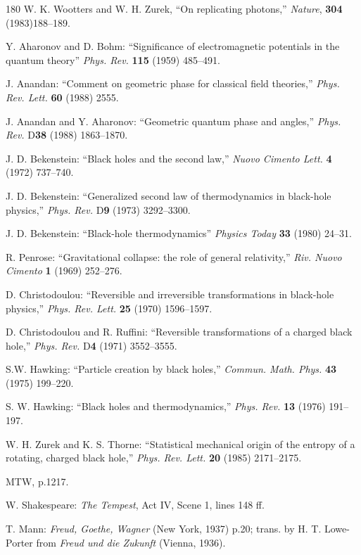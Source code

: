 \documentclass[11pt]{article}
\begin{document}
\begin{thebibliography}{180}
		W. K. Wootters and W. H. Zurek, ``On replicating photons,'' \emph{Nature}, \textbf{304} (1983)188--189.
		
		Y. Aharonov and D. Bohm: ``Significance of electromagnetic potentials in the quantum theory'' \emph{Phys. Rev.} \textbf{115} (1959) 485--491.
		
		J. Anandan: ``Comment on geometric phase for classical field theories,'' \emph{Phys. Rev. Lett.} \textbf{60} (1988) 2555.
		
		J. Anandan and Y. Aharonov: ``Geometric quantum phase and angles,'' \emph{Phys. Rev.} D\textbf{38} (1988) 1863--1870.
		
		J. D. Bekenstein: ``Black holes and the second law,'' \emph{Nuovo Cimento Lett.} \textbf{4} (1972) 737--740.
		
		J. D. Bekenstein: ``Generalized second law of thermodynamics in black-hole physics,'' \emph{Phys. Rev.} D\textbf{9} (1973) 3292--3300.
		
		J. D. Bekenstein: ``Black-hole thermodynamics'' \emph{Physics Today} \textbf{33} (1980) 24--31.
		
		R. Penrose: ``Gravitational collapse: the role of general relativity,'' \emph{Riv. Nuovo Cimento} \textbf{1} (1969) 252--276.
		
		D. Christodoulou: ``Reversible and irreversible transformations in black-hole physics,'' \emph{Phys. Rev. Lett.} \textbf{25} (1970) 1596--1597.
		
		D. Christodoulou and R. Ruffini: ``Reversible transformations of a charged black hole,'' \emph{Phys. Rev.} D\textbf{4} (1971) 3552--3555.
		
		S.W. Hawking: ``Particle creation by black holes,'' \emph{Commun. Math. Phys.} \textbf{43} (1975) 199--220.
		
		S. W. Hawking: ``Black holes and thermodynamics,'' \emph{Phys. Rev.} \textbf{13} (1976) 191--197.
		
		W. H. Zurek and K. S. Thorne: ``Statistical mechanical origin of the entropy of a rotating, charged black hole,'' \emph{Phys. Rev. Lett.} \textbf{20} (1985) 2171--2175.
		
		MTW, p.1217.
		
		W. Shakespeare: \emph{The Tempest}, Act IV, Scene 1, lines 148 ff.
		
		T. Mann: \emph{Freud, Goethe, Wagner} (New York, 1937) p.20; trans. by H. T. Lowe-Porter from \emph{Freud und die Zukunft} (Vienna, 1936).
		

\end{thebibliography}
\end{document}
